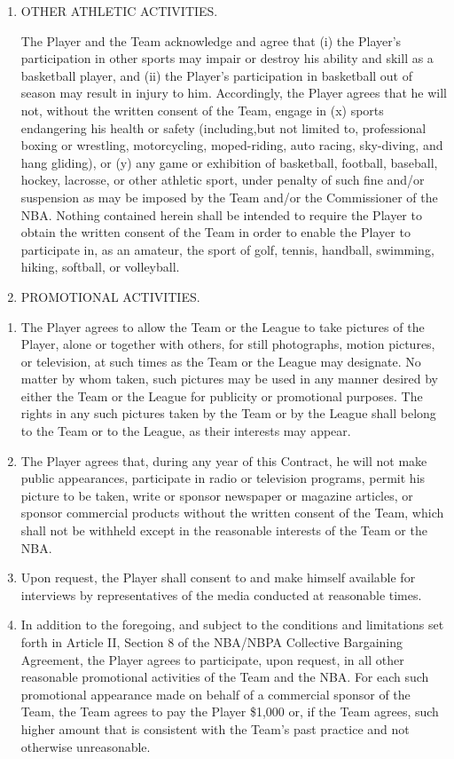 \documentclass[
]{book}
\providecommand{\tightlist}{%
  \setlength{\itemsep}{0pt}\setlength{\parskip}{0pt}}
\begin{document}
\begin{enumerate}
\def\labelenumi{\arabic{enumi}.}
\setcounter{enumi}{11}
\item
  OTHER ATHLETIC ACTIVITIES.

  The Player and the Team acknowledge and agree that (i) the Player's participation in other sports may impair or destroy his ability and skill as a basketball player, and (ii) the Player's participation in basketball out of season may result in injury to him. Accordingly, the Player agrees that he will not, without the written consent of the Team, engage in (x) sports endangering his health or safety (including,but not limited to, professional boxing or wrestling, motorcycling, moped-riding, auto racing, sky-diving, and hang gliding), or (y) any game or exhibition of basketball, football, baseball, hockey, lacrosse, or other athletic sport, under penalty of such fine and/or suspension as may be imposed by the Team and/or the Commissioner of the NBA. Nothing contained herein shall be intended to require the Player to obtain the written consent of the Team in order to enable the Player to participate in, as an amateur, the sport of golf, tennis, handball, swimming, hiking, softball, or volleyball.
\item
  PROMOTIONAL ACTIVITIES.
\end{enumerate}

\begin{enumerate}
\def\labelenumi{(\alph{enumi})}
\tightlist
\item
  The Player agrees to allow the Team or the League to take pictures of the Player, alone or together with others, for still photographs, motion pictures, or television, at such times as the Team or the League may designate. No matter by whom taken, such pictures may be used in any manner desired by either the Team or the League for publicity or promotional purposes. The rights in any such pictures taken by the Team or by the League shall belong to the Team or to the League, as their interests may appear.
\item
  The Player agrees that, during any year of this Contract, he will not make public appearances, participate in radio or television programs, permit his picture to be taken, write or sponsor newspaper or magazine articles, or sponsor commercial products without the written consent of the Team, which shall not be withheld except in the reasonable interests of the Team or the NBA.
\item
  Upon request, the Player shall consent to and make himself available for interviews by representatives of the media conducted at reasonable times.
\item
  In addition to the foregoing, and subject to the conditions and limitations set forth in Article II, Section 8 of the NBA/NBPA Collective Bargaining Agreement, the Player agrees to participate, upon request, in all other reasonable promotional activities of the Team and the NBA. For each such promotional appearance made on behalf of a commercial sponsor of the Team, the Team agrees to pay the Player \$1,000 or, if the Team agrees, such higher amount that is consistent with the Team's past practice and not otherwise unreasonable.
\end{enumerate}
\end{document}
